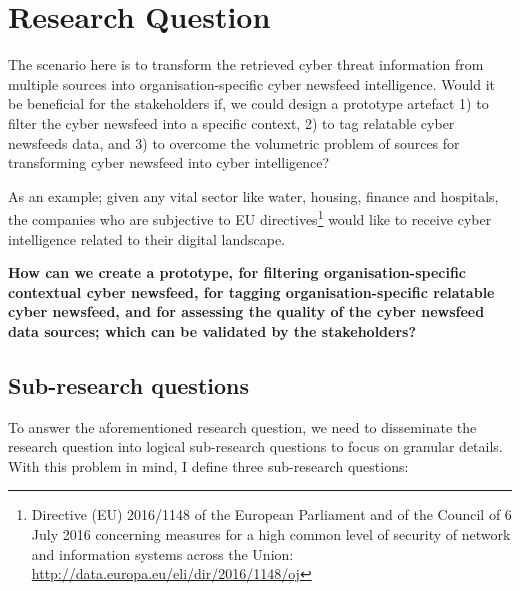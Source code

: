 \section{Research Question}\label{Research Question}
The scenario here is to transform the retrieved cyber threat information from multiple sources into organisation-specific cyber newsfeed intelligence. Would it be beneficial for the stakeholders if,  we could design a prototype artefact 1) to filter the cyber newsfeed into a specific context, 2) to tag relatable cyber newsfeeds data, and 3) to overcome the volumetric problem of sources for transforming cyber newsfeed into cyber intelligence?

As an example; given any vital sector
\citep[table 2]{luiijf2003critical} like water, housing, finance and hospitals, the companies who are subjective to EU directives\footnote{Directive (EU) 2016/1148 of the European Parliament and of the Council of 6 July 2016 concerning measures for a high common level of security of network and information systems across the Union: \url{http://data.europa.eu/eli/dir/2016/1148/oj}} would like to receive  cyber intelligence related to their digital landscape.

\bigbreak
\textbf{How can we create a prototype, for filtering organisation-specific contextual cyber newsfeed, for tagging organisation-specific relatable cyber newsfeed, and for assessing the quality of the cyber newsfeed data sources; which can be validated by the stakeholders?}

\subsection{Sub-research questions}\label{Sub-research question}
To answer the aforementioned research question, we need to disseminate the research question into logical  sub-research questions to focus on granular details. With this problem  in mind, I  define three sub-research questions:

